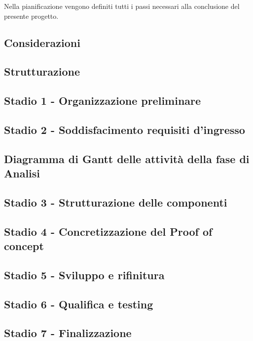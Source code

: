 Nella pianificazione vengono definiti tutti i passi necessari alla conclusione del presente progetto.

\subsection{Considerazioni}\label{sec:Considerazioni}


\subsection{Strutturazione}\label{sec:Strutturazione}


\subsection{Stadio 1 - Organizzazione preliminare}\label{sec:Stadio1}


\subsection{Stadio 2 - Soddisfacimento requisiti d'ingresso}\label{sec:Stadio2}


\newpage
\subsection{Diagramma di Gantt delle attività della fase di Analisi}\label{sec:Stadio2}

    
\subsection{Stadio 3 - Strutturazione delle componenti}\label{sec:Stadio3}

    
\subsection{Stadio 4 - Concretizzazione del Proof of concept}\label{sec:Stadio4}

    
\subsection{Stadio 5 - Sviluppo e rifinitura }\label{sec:Stadio5}

    
\subsection{Stadio 6 - Qualifica e testing}\label{sec:Stadio6}

    
\subsection{Stadio 7 - Finalizzazione}\label{sec:Stadio7}
